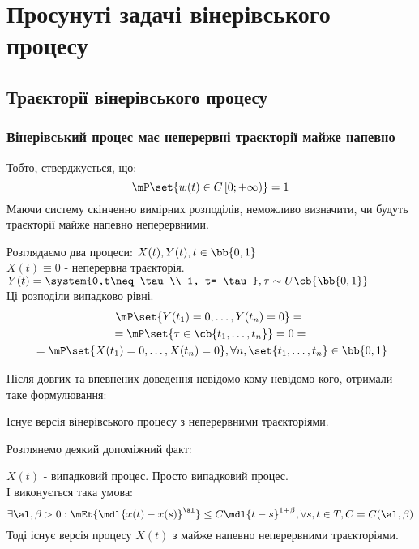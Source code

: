 \section{Просунуті задачі вінерівського процесу} 
\subsection{Траєкторії вінерівського процесу}
\subsubsection{Вінерівський процес має неперервні траєкторії майже напевно}
Тобто, стверджується, що:
\begin{equation}
\mP\set{w(t) \in C\left[0;+\infty\right)}=1
\end{equation}
Маючи систему скінченно вимірних розподілів, неможливо визначити, чи будуть траєкторії майже напевно неперервними.\\
\begin{exs}
Розглядаємо два процеси: $X(t),Y(t),t\in\bb{0,1}$\\
$X(t) \equiv 0$ - неперервна траєкторія.\\
$Y(t) = \system{0,t\neq \tau\\ 1, t= \tau},\tau\sim U\cb{\bb{0,1}}$\\
Ці розподіли випадково рівні. 
\begin{multline*}
\mP\set{Y(t_1)=0,\ldots,Y(t_n)=0} ={}\\{}= \mP\set{\tau\in\cb{t_1,\ldots,t_n}} = 0 ={}\\{}= \mP\set{X(t_1)=0,\ldots,X(t_n)=0},\forall n,\set{t_1,\ldots,t_n}\in\bb{0,1}
\end{multline*}
\end{exs}
Після довгих та впевнених доведення невідомо кому невідомо кого, отримали таке формулювання:
\begin{teor}
Існує версія вінерівського процесу з неперервними траєкторіями.
\end{teor}
Розглянемо деякий допоміжний факт:
\begin{teor}
$X(t)$ - випадковий процес. Просто випадковий процес.\\
І виконується така умова:
\begin{equation*}
\exists \al,\beta>0: \mEt{\mdl{x(t)-x(s)}^\al}\leq C\mdl{t-s}^{1+\beta},\forall s,t\in T,C=C(\al,\beta)
\end{equation*}
Тоді існує версія процесу $X(t)$ з майже напевно неперервними траєкторіями.
\end{teor}
